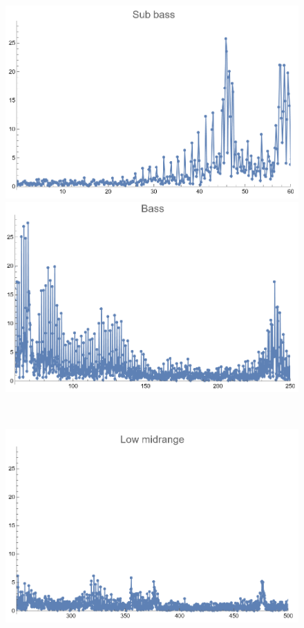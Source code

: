 \documentclass[12pt, letterpaper]{article}
\begin{document}
\begin{figure}[H]
  \centering
  \begin{minipage}{.3\textwidth}
    \centering
    \includegraphics[width=.9\linewidth]{imgs/Cancion6/subbass.png}
  \end{minipage}
  \begin{minipage}{0.03\textwidth}\end{minipage}
  \begin{minipage}{.3\textwidth}
    \centering
    \includegraphics[width=.9\linewidth]{imgs/Cancion6/bass.png}
  \end{minipage} \medskip \\
  \begin{minipage}{.3\textwidth}
    \centering
    \includegraphics[width=.9\linewidth]{imgs/Cancion6/lowmid.png}

\end{minipage}
\end{figure}
\end{document}
